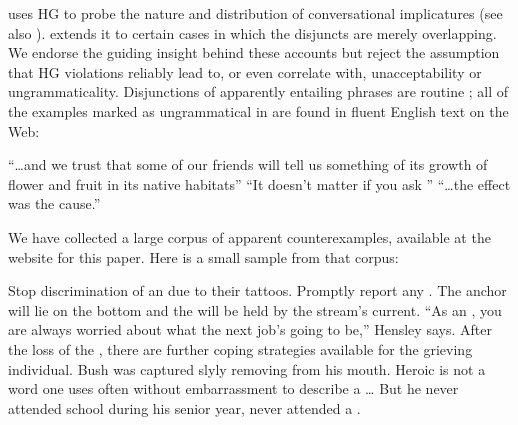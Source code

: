 \documentclass[12pt,twoside]{article}
\renewcommand{\_}{\textbf{\textunderscore\hspace{-4pt}\textunderscore\hspace{-3pt}\textunderscore\hspace{-4pt}\textunderscore}\hspace{0.5pt}}			%
\begin{document}
\citeauthor{Hurford:1974} uses HG to probe the nature and distribution
of conversational implicatures (see also
\citealt{Gazdar79b,ChierchiaFoxSpector08}). \citet{Singh:2008} extends
it to certain cases in which the disjuncts are merely overlapping. We
endorse the guiding insight behind these accounts but reject the
assumption that HG violations reliably lead to, or even correlate
with, unacceptability or ungrammaticality. Disjunctions of apparently
entailing phrases are routine \citep{Simons:2001}; all of the examples
marked as ungrammatical in  are found in fluent English text
on the Web:
%
\begin{exe}
\ex\label{hex-good}
  \begin{xlist}
  \ex ``\ldots and we trust that some of our  friends will tell us something of its growth of
    flower and fruit in its native habitats''
  \ex ``It doesn't matter if you ask ''
  \ex ``\ldots the effect was 
    the cause.''
  \end{xlist}
\end{exe}

We have collected a large corpus of apparent counterexamples,
available at the website for this paper. Here is a small sample from
that corpus:
%
\begin{exe}
\ex\label{ourcorpus} 
  \begin{xlist}
  \ex Stop discrimination of an  due
    to their tattoos.
  \ex Promptly report any .
  \ex The anchor will lie on the bottom and the  will be held by the stream's current.
  \ex ``As an , you are always worried
    about what the next job's going to be,'' Hensley says.
  \ex After the loss of the , there are
    further coping strategies available for the grieving individual.
  \ex Bush was captured slyly removing 
    from his mouth.
  \ex Heroic is not a word one uses often without embarrassment to
    describe a  \ldots
  \ex But he never attended school during his senior year, never
    attended a .
  \end{xlist}
\end{exe}
\end{document}

